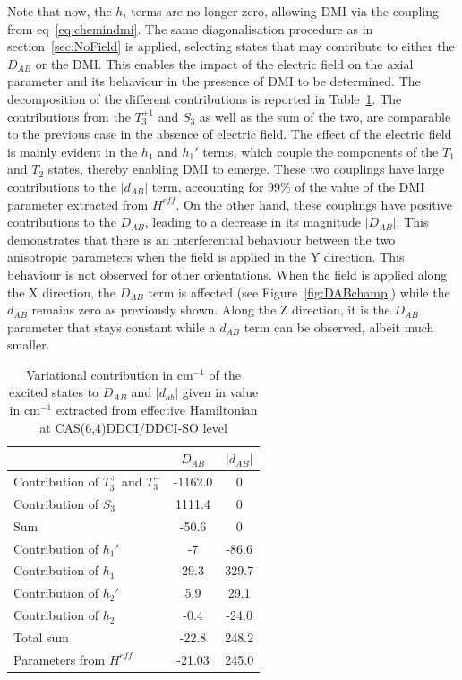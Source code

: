 \documentclass[12pt]{report}
\numberwithin{equation}{section}
\begin{document}
Note that now, the $h_i$ terms are no longer zero, allowing DMI via the coupling from eq~\ref{eq:chemindmi}.
The same diagonalisation procedure as in section~\ref{sec:NoField} is applied, selecting states that may contribute to either the $D_{AB}$ or the DMI.
This enables the impact of the electric field on the axial parameter and its behaviour in the presence of DMI to be determined.
The decomposition of the different contributions is reported in Table~\ref{tab:decompfield}.
The contributions from the $T_3^{\pm1}$ and $S_3$ as well as the sum of the two, are comparable to the previous case in the absence of electric field.
The effect of the electric field is mainly evident in the $h_1$ and $h_1'$ terms, which couple the components of the $T_1$ and $T_2$ states, thereby enabling DMI to emerge.
These two couplings have large contributions to the $|d_{AB}|$ term, accounting for 99\% of the value of the DMI parameter extracted from $H^{eff}$.
On the other hand, these couplings have positive contributions to the $D_{AB}$, leading to a decrease in its magnitude $|D_{AB}|$.
This demonstrates that there is an interferential behaviour between the two anisotropic parameters when the field is applied in the Y direction.
This behaviour is not observed for other orientations. 
When the field is applied along the X direction, the $D_{AB}$ term is affected (see Figure~\ref{fig:DABchamp}) while the $d_{AB}$ remains zero as previously shown.
Along the Z direction, it is the $D_{AB}$ parameter that stays constant while a $d_{AB}$ term can be observed, albeit much smaller.

\begin{table}
    \centering
    \begin{tabular}{l c c}
        \hline
        \hline
         & $D_{AB}$ & $|d_{AB}|$\\
         \hline
         Contribution of $T_3^+$ and $T_3^-$& -1162.0& 0 \\
         Contribution of $S_3$& 1111.4 & 0\\
         Sum & -50.6 &0\\
         Contribution of $h_1'$ & -7 & -86.6\\
         Contribution of $h_1$& 29.3 & 329.7\\
         Contribution of $h_2'$& 5.9 & 29.1\\
         Contribution of $h_2$ & -0.4 & -24.0\\
         Total sum & -22.8  & 248.2\\
         Parameters from $H^{eff}$ & -21.03 & 245.0\\
         \hline
         \hline
    \end{tabular}
    \caption{Variational contribution in cm$^{-1}$ of the excited states to $D_{AB}$ and $|d_{ab}|$ given in value in cm$^{-1}$ extracted from effective Hamiltonian at CAS(6,4)DDCI/DDCI-SO level}
    \label{tab:decompfield}
\end{table}
\end{document}
